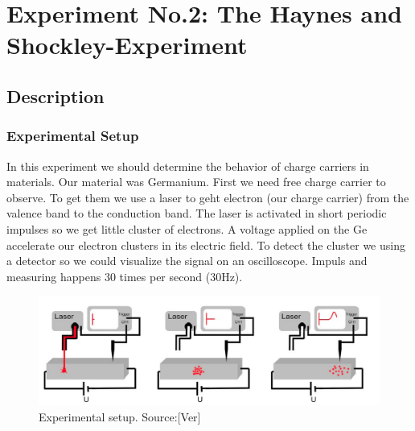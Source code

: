 \chapter{Experiment No.2: The Haynes and Shockley-Experiment}
\section{Description}
\subsection*{Experimental Setup}
In this experiment we should determine the behavior of charge carriers in materials. Our material was Germanium. First we need free charge carrier to observe. To get them we use a laser to geht electron (our charge carrier) from the valence band to the conduction band. The laser is activated in short periodic impulses so we get little cluster of electrons. A voltage applied on the Ge accelerate our electron clusters in its electric field. To detect the cluster we using a detector so we could visualize the signal on an oscilloscope. Impuls and measuring happens 30 times per second (30Hz).
\begin{figure}[h]
\begin{center}
\includegraphics[scale=0.5]{Bilder/aufbau_teil2}
\caption{Experimental setup. Source:[Ver] }
\label{fig:aufbau2}
\end{center}
\end{figure}
